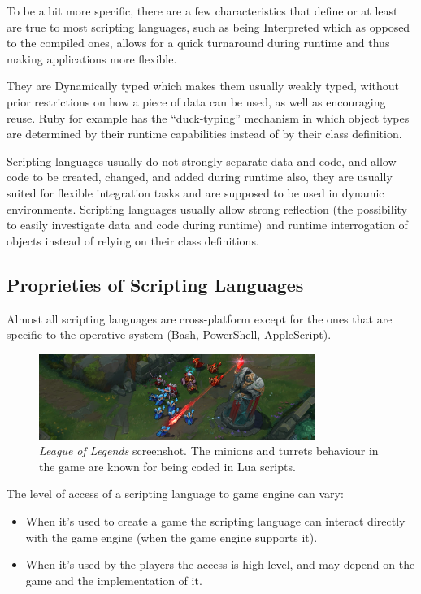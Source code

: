\documentclass[12pt]{article}
\begin{document}
To be a bit more specific, there are a few characteristics that define or at least are true to most scripting languages, such as being Interpreted which as opposed to the compiled ones, allows for a quick turnaround during runtime and thus making applications more flexible.

They are Dynamically typed which makes them usually weakly typed, without prior restrictions on how a piece of data can be used, as well as encouraging reuse. Ruby for example has the “duck-typing” mechanism in which object types are determined by their runtime capabilities instead of by their class definition.

Scripting languages usually do not strongly separate data and code, and allow code to be created, changed, and added during runtime also, they are usually suited for flexible integration tasks and are supposed to be used in dynamic environments. Scripting languages usually allow strong reflection (the possibility to easily investigate data and code during runtime) and runtime interrogation of objects instead of relying on their class definitions.

\subsection{Proprieties of Scripting Languages}

Almost all scripting languages are cross-platform except for the ones that are specific to the operative system (Bash, PowerShell, AppleScript).

\begin{figure}[h!]
    \centering
    \includegraphics[width=0.8\textwidth]{lol.jpg}
    \caption{\textit{League of Legends} screenshot. The minions and turrets behaviour in the game are known for being coded in Lua scripts.}
    \label{fig:awesome_image}
\end{figure}

The level of access of a scripting language to game engine can vary:
\begin{itemize}
\item When it's used to create a game the scripting language can interact directly with the game engine (when the game engine supports it).
\item When it's used  by the players the access is high-level, and may depend on the game and the implementation of it.
\end{itemize}
\end{document}
